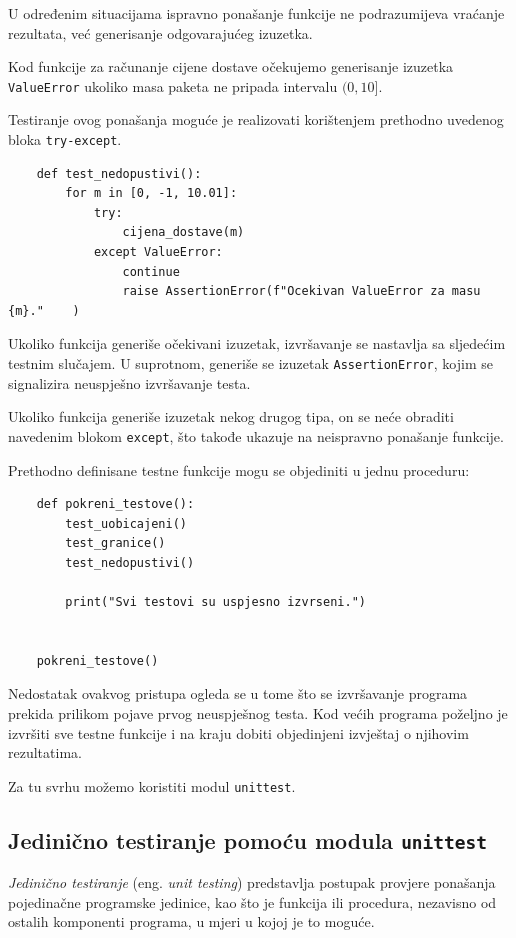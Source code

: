 U određenim situacijama ispravno ponašanje funkcije 
ne podrazumijeva vraćanje rezultata, već generisanje 
odgovarajućeg izuzetka.

Kod funkcije za računanje cijene dostave očekujemo 
generisanje izuzetka \texttt{ValueError} ukoliko 
masa paketa ne pripada intervalu $(0,10]$.

Testiranje ovog ponašanja moguće je realizovati 
korištenjem prethodno uvedenog bloka 
\texttt{try-except}.

\begin{verbatim}
	def test_nedopustivi():
	    for m in [0, -1, 10.01]:
	        try:
	            cijena_dostave(m)
	        except ValueError:
	            continue
	            raise AssertionError(f"Ocekivan ValueError za masu {m}."	)
\end{verbatim}

Ukoliko funkcija generiše očekivani izuzetak, 
izvršavanje se nastavlja sa sljedećim testnim slučajem. 
U suprotnom, generiše se izuzetak 
\texttt{AssertionError}, kojim se signalizira 
neuspješno izvršavanje testa.

Ukoliko funkcija generiše izuzetak nekog drugog tipa, 
on se neće obraditi navedenim blokom \texttt{except}, 
što takođe ukazuje na neispravno ponašanje funkcije.

Prethodno definisane testne funkcije mogu se objediniti 
u jednu proceduru:

\begin{verbatim}
	def pokreni_testove():
	    test_uobicajeni()
	    test_granice()
	    test_nedopustivi()
	
    	print("Svi testovi su uspjesno izvrseni.")
	
	
	pokreni_testove()
\end{verbatim}

Nedostatak ovakvog pristupa ogleda se u tome što se 
izvršavanje programa prekida prilikom pojave prvog 
neuspješnog testa. Kod većih programa poželjno je 
izvršiti sve testne funkcije i na kraju dobiti 
objedinjeni izvještaj o njihovim rezultatima.

Za tu svrhu možemo koristiti modul \texttt{unittest}.


\subsection{Jedinično testiranje pomoću modula \texttt{unittest}}

\textit{Jedinično testiranje} (eng. \emph{unit testing}) 
predstavlja postupak provjere ponašanja pojedinačne 
programske jedinice, kao što je funkcija ili procedura, 
nezavisno od ostalih komponenti programa, u mjeri u 
kojoj je to moguće.

